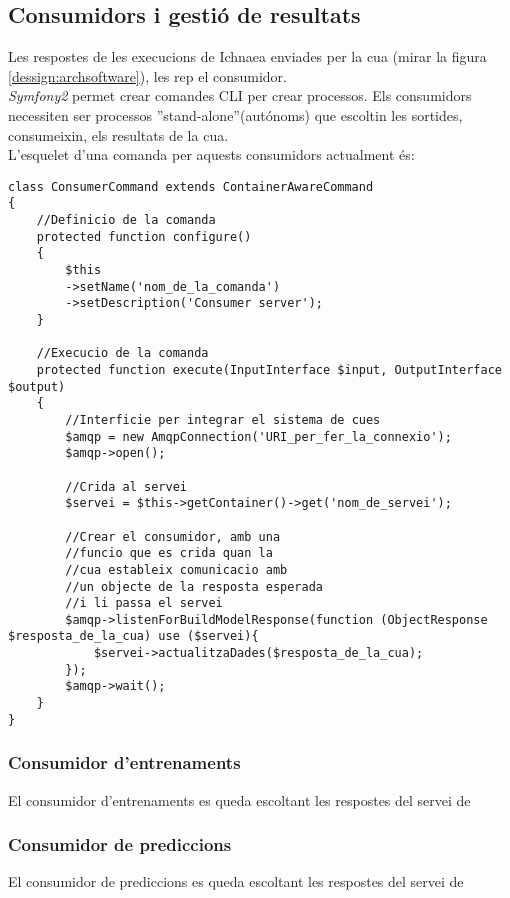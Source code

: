 \subsection{Consumidors i gesti\'{o} de resultats}
Les respostes de les execucions de Ichnaea enviades per la cua (mirar la figura \ref{dessign:archsoftware}), les rep el consumidor. \\
\textit{Symfony2} permet crear comandes CLI per crear processos. Els consumidors necessiten ser processos ''stand-alone''(aut\'{o}noms) que escoltin les sortides, consumeixin, els resultats de la cua. \\
L'esquelet d'una comanda per aquests consumidors actualment \'{e}s:
\begin{lstlisting}
class ConsumerCommand extends ContainerAwareCommand
{
	//Definicio de la comanda
	protected function configure()
	{
		$this
		->setName('nom_de_la_comanda')
		->setDescription('Consumer server');
	}
	
	//Execucio de la comanda
	protected function execute(InputInterface $input, OutputInterface $output)
	{
		//Interficie per integrar el sistema de cues
		$amqp = new AmqpConnection('URI_per_fer_la_connexio');
		$amqp->open();
		
		//Crida al servei
		$servei = $this->getContainer()->get('nom_de_servei');
		
		//Crear el consumidor, amb una 
		//funcio que es crida quan la 
		//cua estableix comunicacio amb 
		//un objecte de la resposta esperada 
		//i li passa el servei 
		$amqp->listenForBuildModelResponse(function (ObjectResponse $resposta_de_la_cua) use ($servei){
			$servei->actualitzaDades($resposta_de_la_cua);
		});
		$amqp->wait();
	}
}
\end{lstlisting}

\subsubsection{Consumidor d'entrenaments}
El consumidor d'entrenaments es queda escoltant les respostes del servei de \\

\subsubsection{Consumidor de prediccions}
El consumidor de prediccions es queda escoltant les respostes del servei de \\

